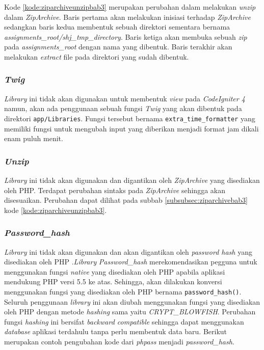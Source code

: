 Kode \ref{kode:ziparchiveunzipbab3} merupakan perubahan dalam melakukan \textit{unzip} dalam \textit{ZipArchive}. Baris pertama akan melakukan inisiasi terhadap \textit{ZipArchive} sedangkan baris kedua membentuk sebuah direktori sementara bernama \textit{assignments\_root/shj\_tmp\_directory}. Baris ketiga akan membuka sebuah \textit{zip} pada \textit{assignments\_root} dengan nama yang dibentuk. Baris terakhir akan melakukan \textit{extract} file pada direktori yang sudah dibentuk.

\subsubsection{\textit{Twig}}
\textit{Library} ini tidak akan digunakan untuk membentuk \textit{view} pada \textit{CodeIgniter 4} namun, akan ada penggunaan sebuah fungsi \textit{Twig} yang akan dibentuk pada direktori \texttt{app/Libraries}. Fungsi tersebut bernama \texttt{extra\_time\_formatter} yang memiliki fungsi untuk mengubah input yang diberikan menjadi format jam dikali enam puluh menit. 

\subsubsection{\textit{Unzip}}
\textit{Library} ini tidak akan digunakan dan digantikan oleh \textit{ZipArchive} yang disediakan oleh PHP. Terdapat perubahan sintaks pada \textit{ZipArchive} sehingga akan disesuaikan. Perubahan dapat dilihat pada subbab \ref{subsubsec:ziparchivebab3} kode \ref{kode:ziparchiveunzipbab3}.

\subsubsection{\textit{Password\_hash}}
\textit{Library} ini tidak akan digunakan dan akan digantikan oleh \textit{password hash} yang disediakan oleh PHP .\textit{Library} \textit{Password\_hash} merekomendasikan pegguna untuk menggunakan fungsi \textit{native} yang disediakan oleh PHP apabila aplikasi mendukung PHP versi 5.5 ke atas. Sehingga, akan dilakukan konversi menggunakan fungsi yang disediakan oleh PHP bernama \texttt{password\_hash()}. Seluruh penggunaan \textit{library} ini akan diubah menggunakan fungsi yang disediakan oleh PHP dengan metode \textit{hashing} sama yaitu \textit{CRYPT\_BLOWFISH}. Perubahan fungsi \textit{hashing} ini bersifat \textit{backward compatible} sehingga dapat menggunakan \textit{database} aplikasi terdahulu tanpa perlu membentuk data baru. Berikut merupakan contoh pengubahan kode dari \textit{phpass} menjadi \textit{password\_hash}.

